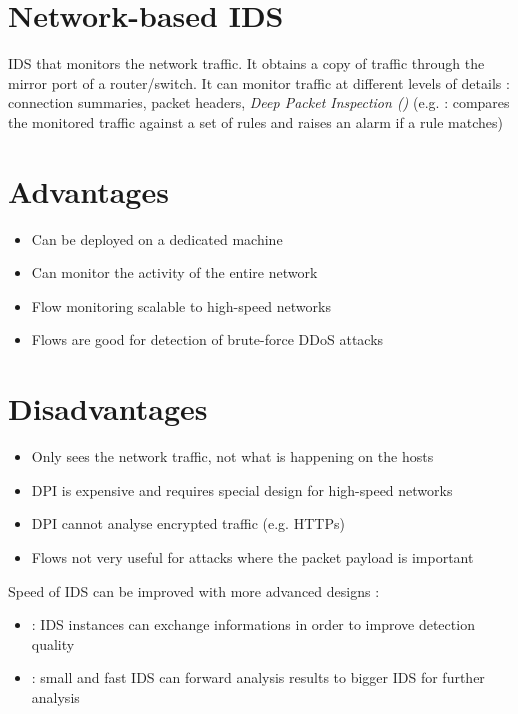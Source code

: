 \section{Network-based IDS}

IDS that monitors the network traffic. It obtains a copy of traffic through the mirror port of a router/switch. It can monitor traffic at different levels of details : connection summaries, packet headers, \textit{Deep Packet Inspection ()} (e.g.  : compares the monitored traffic against a set of rules and raises an alarm if a rule matches)

\begin{minipage}[t]{0.46\textwidth}
    \section{Advantages}
    \begin{itemize}
        \item Can be deployed on a dedicated machine
        \item Can monitor the activity of the entire network
        \item Flow monitoring scalable to high-speed networks
        \item Flows are good for detection of brute-force DDoS attacks
    \end{itemize}
\end{minipage}
\hfill
\begin{minipage}[t]{0.46\textwidth}
    \section{Disadvantages}
    \begin{itemize}
        \item Only sees the network traffic, not what is happening on the hosts
        \item DPI is expensive and requires special design for high-speed networks
        \item DPI cannot analyse encrypted traffic (e.g. HTTPs)
        \item Flows not very useful for attacks where the packet payload is important
    \end{itemize}
\end{minipage}

Speed of IDS can be improved with more advanced designs :

\begin{itemize}
    \item {} : IDS instances can exchange informations in order to improve detection quality
    \item {} : small and fast IDS can forward analysis results to bigger IDS for further analysis
\end{itemize}


